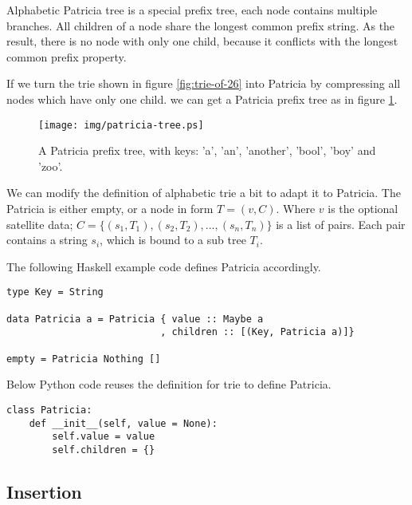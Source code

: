 \documentclass{article}
\begin{document}
Alphabetic Patricia tree is a special prefix tree, each node contains
multiple branches. All children of a node share the longest common
prefix string. As the result, there is no node with only one child,
because it conflicts with the longest common prefix property.

If we turn the trie shown in figure \ref{fig:trie-of-26} into Patricia
by compressing all nodes which have only one child. we can get
a Patricia prefix tree as in figure \ref{fig:patricia-tree}.

\begin{figure}[htbp]
  \centering
  \texttt{[image: img/patricia-tree.ps]}
  \caption{A Patricia prefix tree, with keys: 'a', 'an', 'another', 'bool',
    'boy' and 'zoo'.}
  \label{fig:patricia-tree}
\end{figure}

We can modify the definition of alphabetic trie a bit to adapt it
to Patricia. The Patricia is either empty, or a node in form $T = (v, C)$.
Where $v$ is the optional satellite data; $C = \{(s_1, T_1), (s_2, T_2), ..., (s_n, T_n)\}$
is a list of pairs. Each pair contains a string $s_i$, which is bound
to a sub tree $T_i$.

The following Haskell example code defines Patricia accordingly.

\lstset{language=Haskell}
\begin{lstlisting}
type Key = String

data Patricia a = Patricia { value :: Maybe a
                           , children :: [(Key, Patricia a)]}

empty = Patricia Nothing []
\end{lstlisting}

Below Python code reuses the definition for trie to define Patricia.

\lstset{language=Python}
\begin{lstlisting}
class Patricia:
    def __init__(self, value = None):
        self.value = value
        self.children = {}
\end{lstlisting}

\subsection{Insertion}
\end{document}
